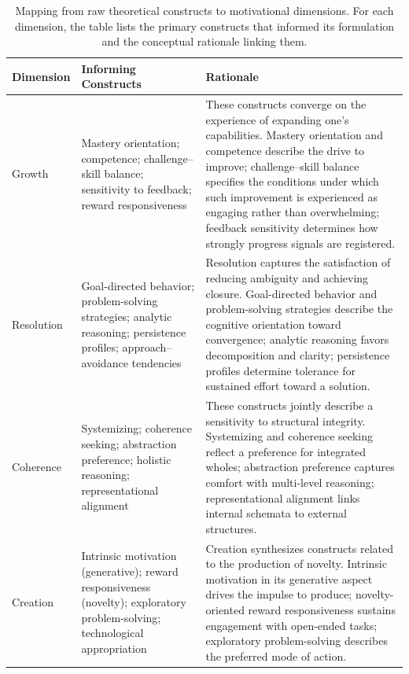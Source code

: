 \documentclass[12pt]{elsarticle}
\begin{document}
\begin{table}[t]
\centering
\caption{Mapping from raw theoretical constructs to motivational dimensions. For each dimension, the table lists the primary constructs that informed its formulation and the conceptual rationale linking them.}
\label{tab:construct-mapping}
\footnotesize
\begin{tabularx}{\linewidth}{l l X}
\toprule
\textbf{Dimension} & \textbf{Informing Constructs} & \textbf{Rationale} \\
\midrule

Growth & 
Mastery orientation; competence; challenge--skill balance; sensitivity to feedback; reward responsiveness &
These constructs converge on the experience of expanding one's capabilities. Mastery orientation and competence describe the drive to improve; challenge--skill balance specifies the conditions under which such improvement is experienced as engaging rather than overwhelming; feedback sensitivity determines how strongly progress signals are registered. \\[3pt]

Resolution & 
Goal-directed behavior; problem-solving strategies; analytic reasoning; persistence profiles; approach--avoidance tendencies &
Resolution captures the satisfaction of reducing ambiguity and achieving closure. Goal-directed behavior and problem-solving strategies describe the cognitive orientation toward convergence; analytic reasoning favors decomposition and clarity; persistence profiles determine tolerance for sustained effort toward a solution. \\[3pt]

Coherence & 
Systemizing; coherence seeking; abstraction preference; holistic reasoning; representational alignment &
These constructs jointly describe a sensitivity to structural integrity. Systemizing and coherence seeking reflect a preference for integrated wholes; abstraction preference captures comfort with multi-level reasoning; representational alignment links internal schemata to external structures. \\[3pt]

Creation & 
Intrinsic motivation (generative); reward responsiveness (novelty); exploratory problem-solving; technological appropriation &
Creation synthesizes constructs related to the production of novelty. Intrinsic motivation in its generative aspect drives the impulse to produce; novelty-oriented reward responsiveness sustains engagement with open-ended tasks; exploratory problem-solving describes the preferred mode of action. \\[3pt]


\end{tabularx}
\end{table}
\end{document}
